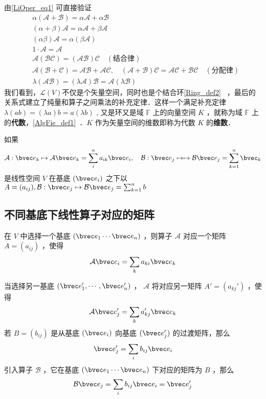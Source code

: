 由\autoref{LiOper_eq1} 可直接验证
\begin{equation}
\begin{aligned}
&\alpha(\mathcal{A+B})=\alpha\mathcal{A}+\alpha\mathcal{B}\\
&(\alpha+\beta)\mathcal{A}=\alpha\mathcal{A}+\beta\mathcal{A}\\
&(\alpha\beta)\mathcal{A}=\alpha(\beta\mathcal{A})\\
&1\cdot \mathcal{A}=\mathcal A\\
&\mathcal{A}(\mathcal{BC})=(\mathcal{AB})\mathcal C\quad(\text{结合律})\\
&\mathcal A(\mathcal{B+C})=\mathcal{AB+AC},\quad (\mathcal{A+B})\mathcal C=\mathcal{AC+BC}\quad(\text{分配律})\\
&\lambda(\mathcal{AB})=(\lambda\mathcal{A})\mathcal{B}=\mathcal{A}(\lambda \mathcal B)
\end{aligned}
\end{equation}
我们看到，$\mathcal{L}(V)$不仅是个矢量空间，同时也是个结合环\autoref{Ring_def2}~ ，最后的关系式建立了纯量和算子之间乘法的补充定律．这样一个满足补充定律 $\lambda(ab)=(\lambda a)b=a(\lambda b)$ , 又是环又是域 $\mathbb{F}$ 上的向量空间 $K$ ，就称为域 $\mathbb{F}$ 上的\textbf{代数}，\autoref{AlgFie_def1}~．$K$ 作为矢量空间的维数即称为代数 $K$ 的\textbf{维数}．

\begin{theorem}{}
如果
\begin{equation}
\mathcal{A}:\bvec e_k\mapsto \mathcal{A}\bvec e_k=\sum_i^{n}a_{ik}\bvec e_i,\quad \mathcal{B}:\bvec e_j\mapsto \mapsto \mathcal{B}\bvec e_j=\sum_{k=1}^n \bvec _k
\end{equation}
是线性空间 $V$ 在基底 $(\bvec e_i)$ 之下以 $A=(a_{ij}), \mathcal{B}:\bvec e_j\mapsto \mathcal{B}\bvec e_j=\sum_{k=1}^n b_{}$
\end{theorem}
\subsection{不同基底下线性算子对应的矩阵}
在 $V$ 中选择一个基底 $(\bvec e_1\cdots \bvec e_n)$ ，则算子 $\mathcal{A}$ 对应一个矩阵 $A=(a_{ij})$ ，使得
\begin{equation}
\mathcal{A}\bvec e_i=\sum_{k} a_{ki}\bvec e_k
\end{equation}

当选择另一基底 $(\bvec e_1',\cdots,\bvec e_n')$ ， $\mathcal{A}$ 将对应另一矩阵 $A'=(a_{kj}')$ ，使得
\begin{equation}
\mathcal{A}\bvec e_j'=\sum_{k} a'_{kj}\bvec e_k
\end{equation}
若 $B=(b_{ij})$ 是从基底 $(\bvec e_i)$ 向基底 $(\bvec e_j')$ 的过渡矩阵，那么
\begin{equation}
\bvec e_j'=\sum_i b_{ij}\bvec e_i
\end{equation}
引入算子 $\mathcal{B}$ ，它在基底 $(\bvec e_1\cdots \bvec e_n)$ 下对应的矩阵为 $B$ ，那么
\begin{equation}
\mathcal{B}\bvec e_j=\sum_i b_{ij}\bvec e_i=\bvec e_j'
\end{equation}

